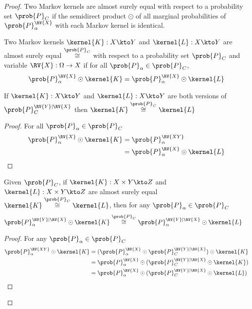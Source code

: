 \begin{proof}
Two Markov kernels are almost surely equal with respect to a probability set $\prob{P}_C$ if the semidirect product $\odot$ of all marginal probabilities of $\prob{P}_\alpha^\RV{X}$ with each Markov kernel is identical.

\begin{definition}\label{def:asequal}
Two Markov kernels $\kernel{K}:X\kto Y$ and $\kernel{L}:X\kto Y$ are almost surely equal $\overset{\prob{P}_C}{\cong}$ with respect to a probability set $\prob{P}_C$ and variable $\RV{X}:\Omega\to X$ if for all $\prob{P}_\alpha \in \prob{P}_C$,
\begin{align}
    \prob{P}^{\RV{X}}_\alpha\odot \kernel{K}=\prob{P}^{\RV{X}}_\alpha\odot \kernel{L}
\end{align}
\end{definition}

\begin{lemma}
If $\kernel{K}:X\kto Y$ and $\kernel{L}:X\kto Y$ are both versions of $\prob{P}_C^{\RV{Y}|\RV{X}}$ then $\kernel{K}\overset{\prob{P}_C}{\cong}\kernel{L}$
\end{lemma}

\begin{proof}
For all $\prob{P}_\alpha \in \prob{P}_C$
\begin{align}
    \prob{P}^{\RV{X}}_\alpha\odot \kernel{K} &= \prob{P}^{\RV{XY}}_\alpha\\
    &= \prob{P}^{\RV{X}}_\alpha\odot \kernel{L}
\end{align}
\end{proof}

\begin{lemma}\label{lem:sub_asequal}
Given $\prob{P}_C$, if $\kernel{K}:X\times Y \kto Z$ and $\kernel{L}:X\times Y \kto Z$ are almost surely equal $\kernel{K}\overset{\prob{P}_C}{\cong}\kernel{L}$, then for any $\prob{P}_\alpha\in \prob{P}_C$
\begin{align}
    \prob{P}_\alpha^{\RV{Y}|\RV{X}}\odot \kernel{K} &\overset{\prob{P}_C}{\cong} \prob{P}_\alpha^{\RV{Y}|\RV{X}}\odot \kernel{L}
\end{align}
\end{lemma}

\begin{proof}
For any $\prob{P}_\alpha\in\prob{P}_C$
\begin{align}
    \prob{P}_\alpha^{\RV{XY}}\odot \kernel{K} &= (\prob{P}_\alpha^{\RV{X}}\odot \prob{P}_C^{\RV{Y}|\RV{X}})\odot \kernel{K}\\
                                              &= \prob{P}_\alpha^{\RV{X}}\odot (\prob{P}_C^{\RV{Y}|\RV{X}}\odot \kernel{K})\\
                                              &= \prob{P}_\alpha^{\RV{X}}\odot (\prob{P}_C^{\RV{Y}|\RV{X}}\odot \kernel{L})
\end{align}
\end{proof}


\end{proof}

